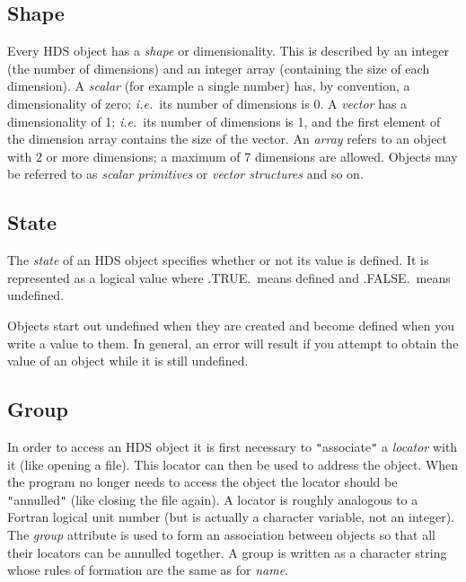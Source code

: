 \documentclass[11pt]{article}
\newcommand{\htmlref}[2]{#1}
\newcommand{\qt}[1]{``#1''}
\newcommand{\st}[1]{{\em{#1}}}
\renewcommand{\qt}[1]{{\tt{"}}#1{\tt{"}}}
\begin{document}
\subsection{\label{sect:shape}Shape}

Every HDS object has a \st{shape} or dimensionality. This is
described by an integer (the number of dimensions) and an integer
array (containing the size of each dimension). A \st{scalar} (for
example a single number) has, by convention, a dimensionality of zero;
\st{i.e.}\ its number of dimensions is 0. A \st{vector} has a
dimensionality of 1; \st{i.e.}\ its number of dimensions is 1, and
the first element of the dimension array contains the size of the
vector.  An \st{array} refers to an object with 2 or more dimensions;
a maximum of 7 dimensions are allowed. Objects may be referred to as
\st{scalar primitives} or \st{vector structures} and so on.

\subsection{State}

The \st{state} of an HDS object specifies whether or not its value is
defined. It is represented as a logical value where .TRUE.\ means
defined and .FALSE.\ means undefined.

Objects start out undefined when they are created and become defined
when you write a value to them. In general, an error will result if
you attempt to obtain the value of an object while it is still
undefined.

\subsection{\label{sect:group}Group}

In order to access an HDS object it is first necessary to
\qt{associate} a \htmlref{\st{locator}}{sect:locators} with it (like
opening a file). This locator can then be used to address the
object. When the program no longer needs to access the object the
locator should be \htmlref{\qt{annulled}}{sect:annul} (like closing
the file again). A locator is roughly analogous to a Fortran logical
unit number (but is actually a character variable, not an
integer). The \st{group} attribute is used to form an association
between objects so that all their locators can be annulled together. A
group is written as a character string whose rules of formation are
the same as for \htmlref{\st{name}}{sect:name}.
\end{document}
